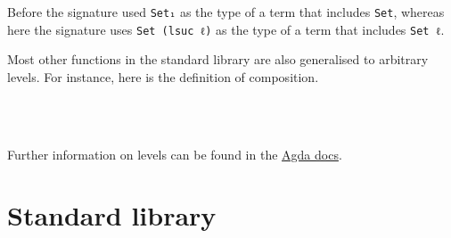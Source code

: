 Before the signature used \texttt{Set₁} as the type of a term that
includes \texttt{Set}, whereas here the signature uses
\texttt{Set\ (lsuc\ ℓ)} as the type of a term that includes
\texttt{Set\ ℓ}.

Most other functions in the standard library are also generalised to
arbitrary levels. For instance, here is the definition of composition.

\begin{fence}
\begin{code}%
\>[0]\AgdaSpace{}%
\AgdaSymbol{:}\AgdaSpace{}%
\AgdaSpace{}%
\AgdaSymbol{\{}\AgdaSpace{}%
\AgdaSpace{}%
\AgdaSpace{}%
\AgdaSymbol{:}\AgdaSpace{}%
\AgdaSymbol{\}}\AgdaSpace{}%
\AgdaSymbol{\{}\AgdaSpace{}%
\AgdaSymbol{:}\AgdaSpace{}%
\AgdaSpace{}%
\AgdaSymbol{\}}\AgdaSpace{}%
\AgdaSymbol{\{}\AgdaSpace{}%
\AgdaSymbol{:}\AgdaSpace{}%
\AgdaSpace{}%
\AgdaSymbol{\}}\AgdaSpace{}%
\AgdaSymbol{\{}\AgdaSpace{}%
\AgdaSymbol{:}\AgdaSpace{}%
\AgdaSpace{}%
\AgdaSymbol{\}}\<%
\\
\>[0][@{}l@{\AgdaIndent{0}}]%
\>[2]\AgdaSpace{}%
\AgdaSymbol{(}\AgdaSpace{}%
\AgdaSpace{}%
\AgdaSymbol{)}\AgdaSpace{}%
\AgdaSpace{}%
\AgdaSymbol{(}\AgdaSpace{}%
\AgdaSpace{}%
\AgdaSymbol{)}\AgdaSpace{}%
\AgdaSpace{}%
\AgdaSpace{}%
\AgdaSpace{}%
\<%
\\
\>[0]\AgdaSymbol{(}\AgdaSpace{}%
\AgdaSpace{}%
\AgdaSymbol{)}\AgdaSpace{}%
%
\>[11]\AgdaSymbol{=}%
\>[14]\AgdaSpace{}%
\AgdaSymbol{(}\AgdaSpace{}%
\AgdaSymbol{)}\<%
\end{code}
\end{fence}

Further information on levels can be found in the
\href{https://agda.readthedocs.io/en/v2.6.1/language/universe-levels.html}{Agda
docs}.

\hypertarget{standard-library}{%
\section{Standard library}\label{standard-library}}

